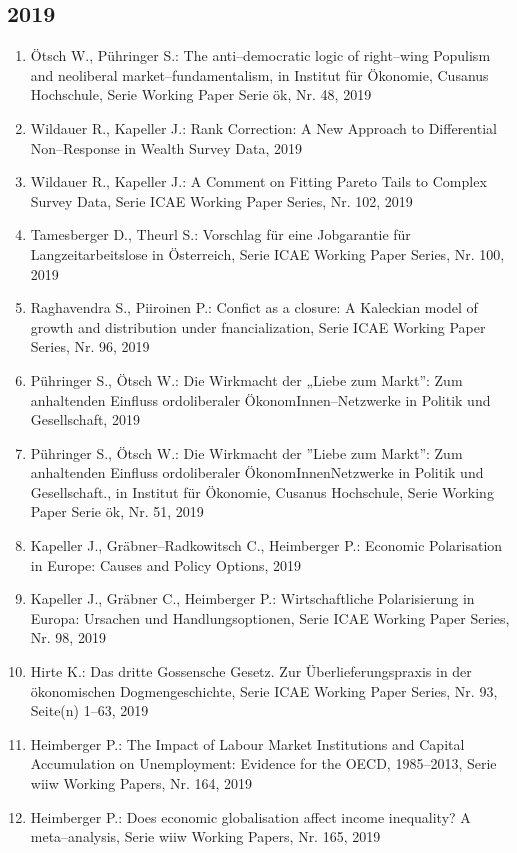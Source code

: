 \subsection*{2019}
\begin{enumerate}
    	 \item Ötsch W., Pühringer S.: The anti--democratic logic of right--wing Populism and neoliberal market--fundamentalism, in Institut für Ökonomie, Cusanus Hochschule, Serie Working Paper Serie ök, Nr. 48, 2019
	 \item Wildauer R., Kapeller J.: Rank Correction: A New Approach to Differential Non--Response in Wealth Survey Data, 2019
	 \item Wildauer R., Kapeller J.: A Comment on Fitting Pareto Tails to Complex Survey Data, Serie ICAE Working Paper Series, Nr. 102, 2019
	 \item Tamesberger D., Theurl S.: Vorschlag für eine Jobgarantie für Langzeitarbeitslose in Österreich, Serie ICAE Working Paper Series, Nr. 100, 2019
	 \item Raghavendra S., Piiroinen P.: Confict as a closure: A Kaleckian model of growth and distribution under fnancialization, Serie ICAE Working Paper Series, Nr. 96, 2019
	 \item Pühringer S., Ötsch W.: Die Wirkmacht der „Liebe zum Markt”: Zum anhaltenden Einfluss ordoliberaler ÖkonomInnen--Netzwerke in Politik und Gesellschaft, 2019
	 \item Pühringer S., Ötsch W.: Die Wirkmacht der ''Liebe zum Markt'': Zum anhaltenden Einfluss ordoliberaler ÖkonomInnenNetzwerke in Politik und Gesellschaft., in Institut für Ökonomie, Cusanus Hochschule, Serie Working Paper Serie ök, Nr. 51, 2019
	 \item Kapeller J., Gräbner--Radkowitsch C., Heimberger P.: Economic Polarisation in Europe: Causes and Policy Options, 2019
	 \item Kapeller J., Gräbner C., Heimberger P.: Wirtschaftliche Polarisierung in Europa: Ursachen und Handlungsoptionen, Serie ICAE Working Paper Series, Nr. 98, 2019
	 \item Hirte K.: Das dritte Gossensche Gesetz. Zur Überlieferungspraxis in der ökonomischen Dogmengeschichte, Serie ICAE Working Paper Series, Nr. 93, Seite(n) 1--63, 2019
	 \item Heimberger P.: The Impact of Labour Market Institutions and Capital Accumulation on Unemployment: Evidence for the OECD, 1985--2013, Serie wiiw Working Papers, Nr. 164, 2019
	 \item Heimberger P.: Does economic globalisation affect income inequality? A meta--analysis, Serie wiiw Working Papers, Nr. 165, 2019

\end{enumerate}
